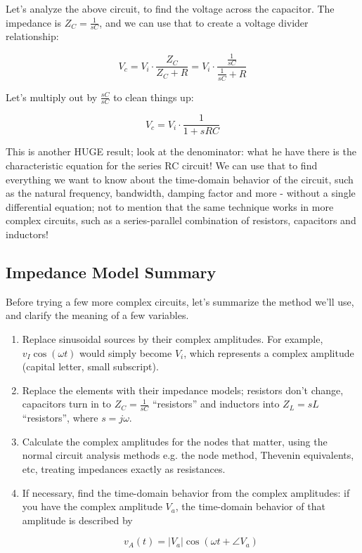 \documentclass[12pt,a4paper]{report}
\begin{document}
Let's analyze the above circuit, to find the voltage across the capacitor. The impedance is $Z_C = \frac{1}{sC}$, and we can use that to create a voltage divider relationship:

\[ V_c = V_i \cdot \frac{Z_C}{Z_C + R} = V_i \cdot \frac{ \frac{1}{sC} }{ \frac{1}{sC} + R} \]

Let's multiply out by $\displaystyle \frac{sC}{sC}$ to clean things up:

\[ V_c = V_i \cdot \frac{1}{1 + sRC} \]

This is another HUGE result; look at the denominator: what he have there is the characteristic equation for the series RC circuit! We can use that to find everything we want to know about the time-domain behavior of the circuit, such as the natural frequency, bandwidth, damping factor and more - without a single differential equation; not to mention that the same technique works in more complex circuits, such as a series-parallel combination of resistors, capacitors and inductors!

\subsection{Impedance Model Summary}
Before trying a few more complex circuits, let's summarize the method we'll use, and clarify the meaning of a few variables.

\begin{enumerate}
\item Replace sinusoidal sources by their complex amplitudes. For example, $v_I \cos{(\omega t)}$ would simply become $V_i$, which represents a complex amplitude (capital letter, small subscript).
\item Replace the elements with their impedance models; resistors don't change, capacitors turn in to $\displaystyle Z_C = \frac{1}{sC} $ ``resistors'' and inductors into $Z_L = sL$ ``resistors'', where $s = j \omega$.
\item Calculate the complex amplitudes for the nodes that matter, using the normal circuit analysis methods e.g. the node method, Thevenin equivalents, etc, treating impedances exactly as resistances.
\item If necessary, find the time-domain behavior from the complex amplitudes: if you have the complex amplitude $V_a$, the time-domain behavior of that amplitude is described by 

\[ v_A(t) = |V_a| \cos{(\omega t + \angle V_a)} \]

\end{enumerate}
\end{document}
